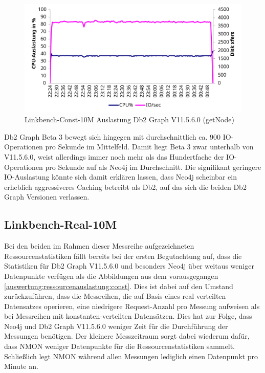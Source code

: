 \begin{figure}[!ht]
    \centering
    \includegraphics[width=\textwidth]{images/stats/linkbench-10m-const_ga.pdf}
    \caption{Linkbench-Const-10M Auslastung Db2 Graph V11.5.6.0 (getNode)}
    \label{fig:nmon:10m:const:ga}
\end{figure}

Db2 Graph Beta 3 bewegt sich hingegen mit durchschnittlich ca. 900 IO-Ope\-ra\-ti\-on\-en pro Sekunde im Mittelfeld. Damit liegt Beta 3 zwar unterhalb von V11.5.6.0, weist allerdings immer noch mehr als das Hundertfache der IO-Ope\-ra\-ti\-on\-en pro Sekunde auf als Neo4j im Durchschnitt. Die signifikant geringere IO-Aus\-last\-ung könnte sich damit erklären lassen, dass Neo4j scheinbar ein erheblich aggressiveres Caching betreibt als Db2, auf das sich die beiden Db2 Graph Versionen verlassen. 

\subsection{Linkbench-Real-10M}
\label{auswertung:ressourcenauslastung:real}
Bei den beiden im Rahmen dieser Messreihe aufgezeichneten Ressourcenstatistiken fällt bereits bei der ersten Begutachtung auf, dass die Statistiken für Db2 Graph V11.5.6.0 und besonders Neo4j über weitaus weniger Datenpunkte verfügen als die Abbildungen aus dem vorausgegangen \autoref{auswertung:ressourcenauslastung:const}. Dies ist dabei auf den Umstand zurückzuführen, dass die Messreihen, die auf Basis eines real verteilten Datensatzes operieren, eine niedrigere Request-Anzahl pro Messung aufweisen als bei Messreihen mit konstanten-verteilten Datensätzen. Dies hat zur Folge, dass Neo4j und Db2 Graph V11.5.6.0 weniger Zeit für die Durchführung der Messungen benötigen. Der kleinere Messzeitraum sorgt dabei wiederum dafür, dass NMON weniger Datenpunkte für die Ressourcenstatistiken sammelt. Schließlich legt NMON während allen Messungen lediglich einen Datenpunkt pro Minute an. 

